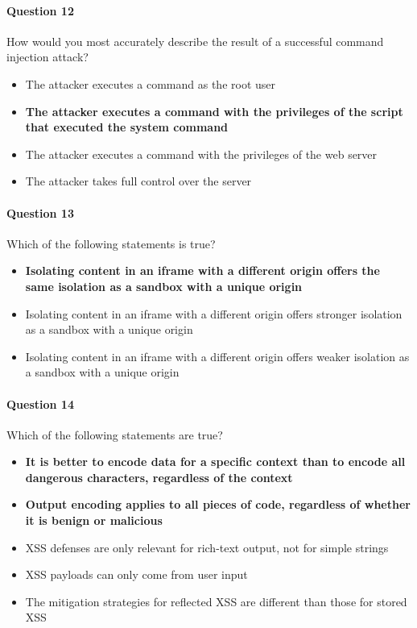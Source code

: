 \documentclass[titlepage]{article}
\begin{document}
    \paragraph{Question 12} How would you most accurately describe the result of a successful command injection attack?
    \begin{itemize}
        \item The attacker executes a command as the root user
        \item \textbf{The attacker executes a command with the privileges of the script that executed the system command} \checkmark
        \item The attacker executes a command with the privileges of the web server
        \item The attacker takes full control over the server
    \end{itemize}
    \paragraph{Question 13} Which of the following statements is true?
    \begin{itemize}
        \item \textbf{Isolating content in an iframe with a different origin offers the same isolation as a sandbox with a unique origin} \checkmark
        \item Isolating content in an iframe with a different origin offers stronger isolation as a sandbox with a unique origin
        \item Isolating content in an iframe with a different origin offers weaker isolation as a sandbox with a unique origin
    \end{itemize}
    \paragraph{Question 14} Which of the following statements are true?
    \begin{itemize}
        \item \textbf{It is better to encode data for a specific context than to encode all dangerous characters, regardless of the context} \checkmark
        \item \textbf{Output encoding applies to all pieces of code, regardless of whether it is benign or malicious} \checkmark
        \item XSS defenses are only relevant for rich-text output, not for simple strings
        \item XSS payloads can only come from user input
        \item The mitigation strategies for reflected XSS are different than those for stored XSS
    \end{itemize}
\end{document}
